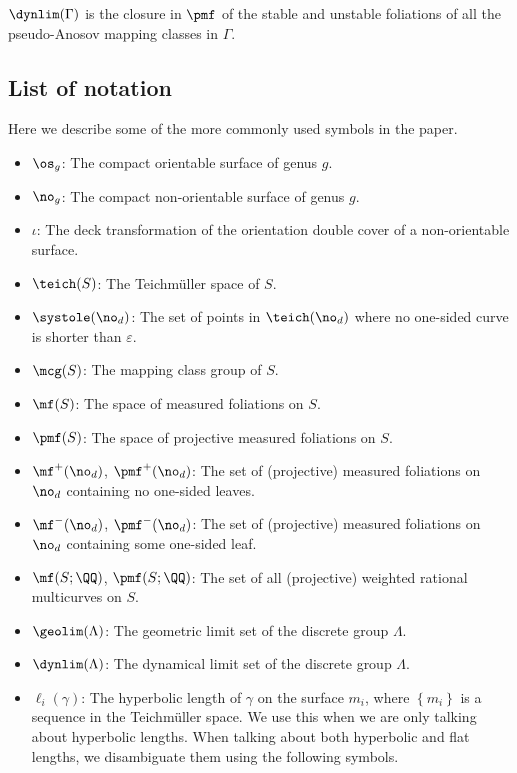 \documentclass[12pt, reqno]{amsart}
\begin{document}
\begin{untheorem}
  \label{thm:equivalence-of-limit-sets}
  $\dynlim(\Gamma)$ is the closure in $\pmf$ of the stable and unstable foliations of all the pseudo-Anosov mapping classes in $\Gamma$.
\end{untheorem}

\subsection*{List of notation}
Here we describe some of the more commonly used symbols in the paper.
\begin{itemize}
\item[] $\os_g$: The compact orientable surface of genus $g$.
\item[] $\no_{g}$: The compact non-orientable surface of genus $g$.
\item[] $\iota$: The deck transformation of the orientation double cover of a non-orientable surface.
\item[] $\teich(S)$: The Teichm\"uller space of $S$.
\item[] $\systole(\no_d)$: The set of points in $\teich(\no_d)$ where no one-sided curve is shorter than
  $\varepsilon$.
\item[] $\mcg(S)$: The mapping class group of $S$.
\item[] $\mf(S)$: The space of measured foliations on $S$.
\item[] $\pmf(S)$: The space of projective measured foliations on $S$.
\item[] $\mf^+(\no_d)$, $\pmf^+(\no_d)$: The set of (projective) measured foliations on $\no_d$ containing
  no one-sided leaves.
\item[] $\mf^-(\no_d)$, $\pmf^-(\no_d)$: The set of (projective) measured foliations on $\no_d$ containing
  some one-sided leaf.
\item[] $\mf(S; \QQ)$, $\pmf(S; \QQ)$: The set of all (projective) weighted rational multicurves on $S$.
\item[] $\geolim(\Lambda)$: The geometric limit set of the discrete group $\Lambda$.
\item[] $\dynlim(\Lambda)$: The dynamical limit set of the discrete group $\Lambda$.
\item[] $\ell_i(\gamma)$: The hyperbolic length of $\gamma$ on the surface $m_i$, where $\left\{ m_i \right\}$ is a sequence in the Teichmüller space. We use this when we are only talking about hyperbolic lengths. When talking about both hyperbolic and flat lengths, we disambiguate them using the following symbols.

\end{itemize}
\end{document}
